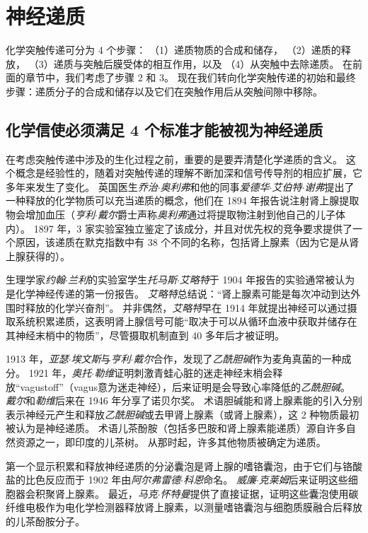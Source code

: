 \chapter{神经递质} \label{chap:chap16}

化学突触传递可分为 4 个步骤：
（1）递质物质的合成和储存，
（2）递质的释放，
（3）递质与突触后膜受体的相互作用，以及
（4）从突触中去除递质。
在前面的章节中，我们考虑了步骤 2 和 3。
现在我们转向化学突触传递的初始和最终步骤：递质分子的合成和储存以及它们在突触作用后从突触间隙中移除。



\section{化学信使必须满足 4 个标准才能被视为神经递质}

在考虑突触传递中涉及的生化过程之前，重要的是要弄清楚化学递质的含义。
这个概念是经验性的，随着对突触传递的理解不断加深和信号传导剂的相应扩展，它多年来发生了变化。
英国医生\textit{乔治$\cdot$奥利弗}和他的同事\textit{爱德华$\cdot$艾伯特$\cdot$谢弗}提出了一种释放的化学物质可以充当递质的概念，他们在 1894 年报告说注射肾上腺提取物会增加血压（\textit{亨利$\cdot$戴尔}爵士声称\textit{奥利弗}通过将提取物注射到他自己的儿子体内）。
1897 年，3 家实验室独立鉴定了该成分，并且对优先权的竞争要求提供了一个原因，该递质在默克指数中有 38 个不同的名称，包括肾上腺素（因为它是从肾上腺获得的）。


生理学家\textit{约翰$\cdot$兰利}的实验室学生\textit{托马斯$\cdot$艾略特}于 1904 年报告的实验通常被认为是化学神经传递的第一份报告。
\textit{艾略特}总结说：“肾上腺素可能是每次冲动到达外围时释放的化学兴奋剂”。
并非偶然，\textit{艾略特}早在 1914 年就提出神经可以通过摄取系统积累递质，这表明肾上腺信号可能“取决于可以从循环血液中获取并储存在其神经末梢中的物质”，尽管摄取机制直到 40 多年后才被证明。


1913 年，\textit{亚瑟$\cdot$埃文斯}与\textit{亨利$\cdot$戴尔}合作，发现了\textit{乙酰胆碱}作为麦角真菌的一种成分。
1921 年，\textit{奥托$\cdot$勒维}证明刺激青蛙心脏的迷走神经末梢会释放“vagustoff”（vagus意为迷走神经），后来证明是会导致心率降低的\textit{乙酰胆碱}。
\textit{戴尔}和\textit{勒维}后来在 1946 年分享了诺贝尔奖。
术语胆碱能和肾上腺素能的引入分别表示神经元产生和释放\textit{乙酰胆碱}或去甲肾上腺素（或肾上腺素），这 2 种物质最初被认为是神经递质。
术语儿茶酚胺（包括多巴胺和肾上腺素能递质）源自许多自然资源之一，即印度的儿茶树。
从那时起，许多其他物质被确定为递质。


第一个显示积累和释放神经递质的分泌囊泡是肾上腺的嗜铬囊泡，由于它们与铬酸盐的比色反应而于 1902 年由\textit{阿尔弗雷德$\cdot$科恩}命名。
\textit{威廉$\cdot$克莱姆}后来证明这些细胞器会积聚肾上腺素。
最近，\textit{马克$\cdot$怀特曼}提供了直接证据，证明这些囊泡使用碳纤维电极作为电化学检测器释放肾上腺素，以测量嗜铬囊泡与细胞质膜融合后释放的儿茶酚胺分子。


